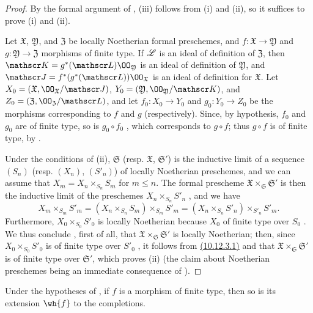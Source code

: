 \begin{proof}
\label{proof-1.10.13.5}
By the formal argument of , (iii) follows from (i) and (ii), so it suffices to prove (i) and (ii).

Let $\mathfrak{X}$, $\mathfrak{Y}$, and $\mathfrak{Z}$ be locally Noetherian formal preschemes, and $f:\mathfrak{X}\to\mathfrak{Y}$ and $g:\mathfrak{Y}\to\mathfrak{Z}$ morphisms of finite type.
If $\mathscr{L}$ is an ideal of definition of $\mathfrak{Z}$, then $\sh{K}=g^*(\sh{L})\OO_\mathfrak{Y}$ is an ideal of definition of $\mathfrak{Y}$, and $\sh{J}=f^*(g^*(\sh{L}))\OO_\mathfrak{X}$ is an ideal of definition for $\mathfrak{X}$.
Let $X_0=(\mathfrak{X},\OO_\mathfrak{X}/\sh{J})$, $Y_0=(\mathfrak{Y},\OO_\mathfrak{Y}/\sh{K})$, and $Z_0=(\mathfrak{Z},\OO_\mathfrak{Z}/\sh{L})$, and let $f_0:X_0\to Y_0$ and $g_0:Y_0\to Z_0$ be the morphisms corresponding to $f$ and $g$ (respectively).
Since, by hypothesis, $f_0$ and $g_0$ are of finite type, so is $g_0\circ f_0$ , which corresponds to $g\circ f$;
thus $g\circ f$ is of finite type, by .

Under the conditions of (ii), $\mathfrak{S}$ (resp. $\mathfrak{X}$, $\mathfrak{S}'$) is the inductive limit of a sequence $(S_n)$ (resp. $(X_n)$, $(S'_n)$) of locally Noetherian preschemes, and we can assume  that $X_m=X_n\times_{S_n}S_m$ for $m\leq n$.
The formal prescheme $\mathfrak{X}\times_\mathfrak{S}\mathfrak{S}'$ is then the inductive limit of the preschemes $X_n\times_{S_n}S'_n$ , and we have
\[
    X_m\times_{S_m}S'_m = (X_n\times_{S_n}S_m)\times_{S_m}S'_m = (X_n\times_{S_n}S'_n)\times_{S'_n}S'_m.
\]
Furthermore, $X_0\times_{S_0}S'_0$ is locally Noetherian because $X_0$ of finite type over $S_0$ .
We thus conclude , first of all, that $\mathfrak{X}\times_\mathfrak{S}\mathfrak{S}'$ is locally Noetherian;
then, since $X_0\times_{S_0}S'_0$ is of finite type over $S'_0$ , it follows from \hyperref[1.10.12.3]{(10.12.3.1)} and  that $\mathfrak{X}\times_\mathfrak{S}\mathfrak{S}'$ is of finite type over $\mathfrak{S}'$, which proves (ii) (the claim about Noetherian preschemes being an immediate consequence of ).
\end{proof}

\begin{cor}[10.13.6]
\label{1.10.13.6}
Under the hypotheses of , if $f$ is a morphism of finite type, then so is its extension $\wh{f}$ to the completions.
\end{cor}

